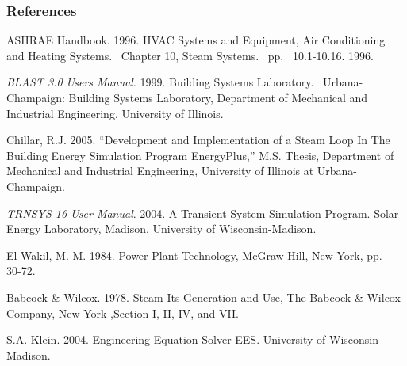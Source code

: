 \subsubsection{References}\label{references-007}

ASHRAE Handbook. 1996. HVAC Systems and Equipment, Air Conditioning and Heating Systems.~ Chapter 10, Steam Systems.~ pp.\emph{~} 10.1-10.16. 1996.

\emph{BLAST 3.0 Users Manual}. 1999. Building Systems Laboratory.~ Urbana-Champaign: Building Systems Laboratory, Department of Mechanical and Industrial Engineering, University of Illinois.

Chillar, R.J. 2005. ``Development and Implementation of a Steam Loop In The Building Energy Simulation Program EnergyPlus,'' M.S. Thesis, Department of Mechanical and Industrial Engineering, University of Illinois at Urbana-Champaign.

\emph{TRNSYS 16 User Manual}. 2004. A Transient System Simulation Program. Solar Energy Laboratory, Madison. University of Wisconsin-Madison.

El-Wakil, M. M. 1984. Power Plant Technology, McGraw Hill, New York, pp.~~ 30-72.

Babcock \& Wilcox. 1978. Steam-Its Generation and Use, The Babcock \& Wilcox Company, New York ,Section I, II, IV, and VII.

S.A. Klein. 2004. Engineering Equation Solver EES. University of Wisconsin Madison.
